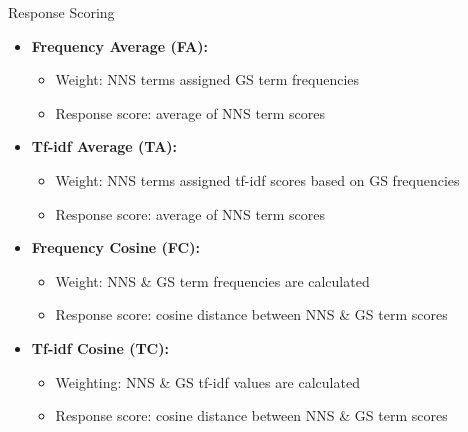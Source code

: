 \documentclass[final,t]{beamer}
\begin{document}
\begin{frame}{}
\begin{columns}[t]
\begin{column}{.64\linewidth}
\begin{columns}
\begin{column}{.48\linewidth}
\begin{block}{Response Scoring}
\begin{center}
\begin{minipage}{.78\textwidth}
  \begin{mdframed}[innertopmargin=15pt,innerbottommargin=15pt,roundcorner=10pt]
  \begin{center}
  \begin{minipage}{.9\textwidth}
    \begin{itemize}
    \item \textbf{Frequency Average (FA):} 
        \begin{itemize}
        \item Weight: NNS terms assigned GS term frequencies
        \item Response score: average of NNS term scores
        \end{itemize}
      \item \textbf{Tf-idf Average (TA):} 
        \begin{itemize}
        \item Weight: NNS terms assigned tf-idf scores based on GS
          frequencies
        \item Response score: average of NNS term scores
        \end{itemize}
      \item \textbf{Frequency Cosine (FC):} 
        \begin{itemize}
        \item Weight: NNS \& GS term frequencies are calculated
        \item Response score: cosine distance between NNS \& GS term
          scores
        \end{itemize}
      \item \textbf{Tf-idf Cosine (TC):} 
        \begin{itemize}
        \item Weighting: NNS \& GS tf-idf values are calculated
        \item Response score: cosine distance between NNS \& GS term
          scores
        \end{itemize}
    \end{itemize}
  \end{minipage}
  \end{center}
  \end{mdframed}
\end{minipage}
\end{center}
\vspace{-.5em}
\end{block}


\end{column}
\end{columns}
\end{column}
\end{columns}
\end{frame}
\end{document}
